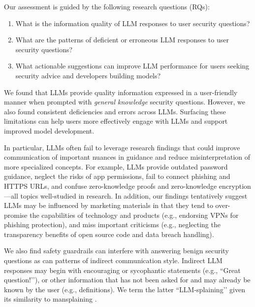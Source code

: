 Our assessment is guided by the following research questions (RQs):

 
\begin{enumerate}[wide, label={\bfseries RQ\arabic*:}, left=0pt..0em, itemindent=2.6em]
    \item What is the information quality of LLM responses to user security questions? %
    \item What are the patterns of deficient or erroneous LLM responses to user security questions? %
    \item What actionable suggestions can improve LLM performance for users seeking security advice and developers building models?%
\end{enumerate}

We found that LLMs provide quality information expressed in a user-friendly manner when prompted with \textit{general knowledge} security questions. However, we also found consistent %
deficiencies and errors across LLMs. %
Surfacing these limitations can help users more effectively engage with LLMs and support improved model development. 

In particular, LLMs often fail to leverage research findings that could improve communication of important nuances in guidance and reduce misinterpretation of more specialized concepts. For example, LLMs provide outdated password guidance, neglect the risks of app permissions, fail to connect phishing and HTTPS URLs, and confuse zero-knowledge proofs and zero-knowledge encryption---all topics well-studied in research. 
In addition, our findings tentatively suggest LLMs may be influenced by marketing materials in that they tend to over-promise the capabilities of technology and products (e.g., endorsing VPNs for phishing protection), and miss important criticisms (e.g., neglecting the transparency benefits of open source code and data breach handling). %


We also find safety guardrails can interfere with answering benign security questions as can patterns of indirect communication style. %
Indirect LLM responses may begin  with encouraging or sycophantic \cite{sharma2023towards} statements (e.g., ``Great question!’’), or other information that has not been asked for and may already be known by the user (e.g., definitions). We term the latter ``LLM-splaining’’ given its similarity to mansplaining \cite{solnit2014men}.

